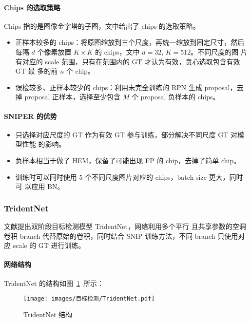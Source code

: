 \paragraph{Chips 的选取策略}
Chips 指的是图像金字塔的子图，文中给出了 chips 的选取策略。

\begin{itemize}
  \item 正样本较多的 chips：将原图缩放到三个尺度，再统一缩放到固定尺寸，然后每隔
    $d$ 个像素放置 $K \times K$ 的 chips，文中 $d = 32,\,K = 512$。不同尺度的图
    片有对应的 scale 范围，只有在范围内的 GT 才认为有效，贪心选取包含有效 GT 最
    多的前 $n$ 个 chip。
  \item 误检较多、正样本较少的 chips：利用未完全训练的 RPN 生成 proposal，去掉
    proposal 正样本，选择至少包含 $M$ 个 proposal 负样本的 chips。
\end{itemize}

\paragraph{SNIPER 的优势}
\begin{itemize}
  \item 只选择对应尺度的 GT 作为有效 GT 参与训练，部分解决不同尺度 GT 对模型性能
    的影响。 
  \item 负样本相当于做了 HEM，保留了可能出现 FP 的 chip，去掉了简单 chip。
  \item 训练时可以同时使用 5 个不同尺度图片对应的 chips，batch size 更大，同时可
    以应用 BN。
\end{itemize}

\subsubsection{TridentNet}
文献提出双阶段目标检测模型 TridentNet，网络利用多个平行
且共享参数的空洞卷积 branch 代替原始的卷积，同时结合 SNIP 训练方法，不同 branch
只使用对应 scale 的 GT 进行训练。 

\paragraph{网络结构}
TridentNet 的结构如图~\ref{fig:tridentnet}~所示：

\begin{figure}[ht]
  \centering
  \texttt{[image: images/目标检测/TridentNet.pdf]}
  \caption{TridentNet 结构}
  \label{fig:tridentnet}
\end{figure}

